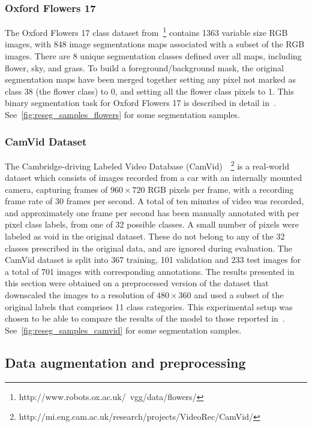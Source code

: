 \subsubsection{Oxford Flowers 17}
The Oxford Flowers 17 class dataset from~\citep{Nilsback06}\footnote{%
http://www.robots.ox.ac.uk/~vgg/data/flowers/} contains 1363
variable size RGB images, with 848 image segmentations maps associated with
a subset of the RGB images. There are 8 unique segmentation classes defined
over all maps, including flower, sky, and grass. To build a
foreground/background mask, the original segmentation maps have been merged
together setting any pixel not marked as class 38 (the flower class) to 0, and
setting all the flower class pixels to 1. This binary segmentation task for
Oxford Flowers 17 is described in detail in~\citep{Xiaomeng14}.
See~\autoref{fig:reseg_samples_flowers} for some segmentation samples.

\subsubsection{CamVid Dataset}\label{sec:reseg+camvid}
The Cambridge-driving Labeled Video Database (CamVid)~\citep{
Brostow2010semantic}~\footnote{%
http://mi.eng.cam.ac.uk/research/projects/VideoRec/CamVid/}
is a real-world dataset which consists of images recorded from a car with an
internally mounted camera, capturing frames of $960 \times 720$ RGB pixels per
frame, with a recording frame rate of 30 frames per second.  A total of ten
minutes of video was recorded, and approximately one frame per second has been
manually annotated with per pixel class labels, from one of 32 possible
classes. A small number of pixels were labeled as void in the original
dataset. These do not belong to any of the 32 classes prescribed in the
original data, and are ignored during evaluation. The CamVid dataset is split
into 367 training, 101 validation and 233 test images for a total of 701 images
with corresponding annotations. The results presented in this section were
obtained on a preprocessed version of the dataset that downscaled the images to
a resolution of $480 \times 360$ and used a subset of the original labels that
comprises 11 class categories. This experimental setup was chosen to be able to
compare the results of the model to those reported
in~\citep{badrinarayanan2015segnet}. See~\autoref{fig:reseg_samples_camvid} for
some segmentation samples.

\subsection{Data augmentation and preprocessing}\label{sec:data_preprocessing}

